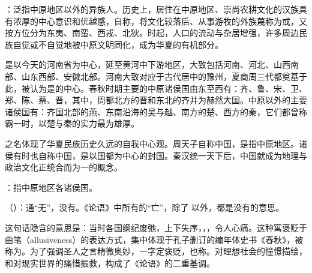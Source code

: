 {
\begin{lyblobitemize}
\item {}：泛指中原地区以外的异族人。历史上，居住在中原地区、崇尚农耕文化的汉族具有浓厚的中心意识和优越感，自称，将文化较落后、从事游牧的外族蔑称为或，又按方位分为东夷、南蛮、西戎、北狄。时起，人口的流动与杂居增强，许多周边民族自觉或不自觉地被中原文明同化，成为华夏的有机部分。

是以今天的河南省为中心，延至黄河中下游地区，大致包括河南、河北、山西南部、山东西部、安徽北部。河南大致对应于古代居中的豫州，夏商周三代都奠基于此，被认为是的中心。春秋时期主要的中原诸侯国由东至西有：齐、鲁、宋、卫、郑、陈、蔡、晋，其中，周都北方的晋和东北的齐并为赫然大国。中原以外的主要诸侯国有：齐国北部的燕、东南沿海的吴与越、南方的楚、西方的秦，它们都曾称霸一时，以楚与秦的实力最为雄厚。 %

之名体现了华夏民族历史久远的自我中心观。周天子自称中国，是指中原地区。诸侯有时也自称中国，是以国都为中心的封国。秦汉统一天下后，中国就成为地理与政治文化正统合而为一的概念。

\item {}：指中原地区各诸侯国。
\item {}（）：通“无”，没有。《论语》中所有的“亡”，除了  以外，都是没有的意思。
\end{lyblobitemize}
这句话隐含的意思是：当时各国纲纪废弛，上下失序，，，令人心痛。这种寓褒贬于曲笔（allusiveness）的表达方式，集中体现于孔子删订的编年体史书《春秋》，被称为。为了强调圣人之言精微奥妙，一字定褒贬，也称。对理想社会的憧憬描绘，和对现实世界的痛惜振救，构成了《论语》的二重基调。
}
{} %


